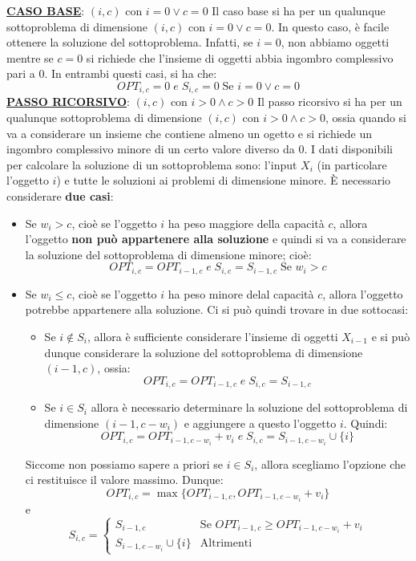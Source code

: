 \documentclass[12pt]{article}
\begin{document}
\textbf{\underline{CASO BASE}}: $(i,c)$ con $i = 0 \vee c = 0$ \newline
Il caso base si ha per un qualunque sottoproblema di dimensione $(i,c)$ con $i = 0 \vee c = 0$. In questo caso, è facile ottenere la soluzione del sottoproblema.
Infatti, se $i = 0$, non abbiamo oggetti mentre se $c = 0$ si richiede che l'insieme di oggetti abbia ingombro complessivo pari a $0$. In entrambi questi casi, si ha che:
$$OPT_{i,c} = 0 \; e \; S_{i,c} = 0 \; \textrm{Se } i = 0 \vee c = 0$$
\textbf{\underline{PASSO RICORSIVO}}: $(i,c)$ con $i > 0 \land c > 0$ \newline
Il passo ricorsivo si ha per un qualunque sottoproblema di dimensione $(i,c)$ con $i > 0 \land c > 0$, ossia quando si va a considerare un insieme che contiene almeno un ogetto e si richiede un ingombro complessivo minore di un certo valore diverso da $0$.
I dati disponibili per calcolare la soluzione di un sottoproblema sono: l'input $X_i$ (in particolare l'oggetto $i$) e tutte le soluzioni ai problemi di dimensione minore. È necessario considerare \textbf{due casi}:
\begin{itemize}
    \item Se $w_i > c$, cioè se l'oggetto $i$ ha peso maggiore della capacità $c$, allora l'oggetto \textbf{non può appartenere alla soluzione} e quindi si va a considerare la soluzione del sottoproblema di dimensione minore; cioè:
    $$OPT_{i,c} = OPT_{i-1, c} \; e \; S_{i,c} = S_{i-1, c} \; \textrm{Se } w_i > c$$
    \item Se $w_i \leq c$, cioè se l'oggetto $i$ ha peso minore delal capacità $c$, allora l'oggetto potrebbe appartenere alla soluzione. Ci si può quindi trovare in due sottocasi:
    \begin{itemize}
        \item Se $i \notin S_i$, allora è sufficiente considerare l'insieme di oggetti $X_{i-1}$ e si può dunque considerare la soluzione del sottoproblema di dimensione $(i-1, c)$, ossia:
        $$OPT_{i,c} = OPT_{i-1, c} \; e \; S_{i,c} = S_{i-1, c}$$
        \item Se $i \in S_i$ allora è necessario determinare la soluzione del sottoproblema di dimensione $(i-1, c- w_i)$ e aggiungere a questo l'oggetto $i$. Quindi:
        $$OPT_{i,c} = OPT_{i-1, c-w_i} + v_i \; e \; S_{i,c} = S_{i-1, c-w_i} \cup \{i\}$$
    \end{itemize}
    Siccome non possiamo sapere a priori se $i \in S_i$, allora scegliamo l'opzione che ci restituisce il valore massimo. Dunque:
    $$OPT_{i,c} = \max\{OPT_{i-1, c}, OPT_{i-1, c-w_i} + v_i\}$$
    e
    \begin{equation*}
        S_{i,c} = \begin{cases}
            S_{i-1,c} & \textrm{Se } OPT_{i-1, c} \geq OPT_{i-1, c-w_i} + v_i \\
            S_{i-1, c-w_i} \cup \{i\} & \textrm{Altrimenti}
        \end{cases}
    \end{equation*}
\end{itemize}
\end{document}
